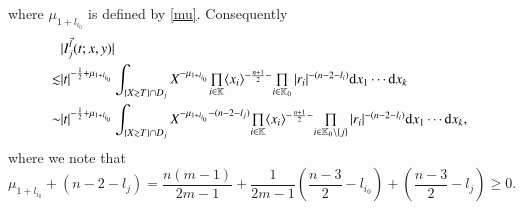 \documentclass[11pt,reqno]{amsart}
\def\d{{\rm d}}
\numberwithin{equation}{section}
\theoremstyle{definition}
\begin{document}
where $\mu_{1+l_{i_0}}$ is defined by \eqref{mu}. Consequently
\begin{equation*}
	\begin{split}
		&|I_j^{\vec{l}}(t;x,y)|\\
		\lesssim&|t|^{-\frac12+\mu_{1+l_{i_0}}}\int_{\{X\gtrsim T\}\cap D_j}X^{-\mu_{1+l_{i_0}}}\mbox{$\prod\limits_{i\in\mathbb{K}}\langle x_i\rangle^{-\frac{n+1}{2}-}$}\mbox{$\prod\limits_{i\in\mathbb{K}_0}|r_i|^{-(n-2-l_i)}$}\d x_1\cdots \d x_k\\
		\sim&|t|^{-\frac12+\mu_{1+l_{i_0}}}\int_{\{X\gtrsim T\}\cap D_j}X^{-\mu_{1+l_{i_0}}-(n-2-l_j)}\mbox{$\prod\limits_{i\in\mathbb{K}}\langle x_i\rangle^{-\frac{n+1}{2}-}$}\mbox{$\prod\limits_{i\in\mathbb{K}_0\setminus\{j\}}|r_i|^{-(n-2-l_i)}$}\d x_1\cdots \d x_k,
	\end{split}
\end{equation*}
where we note that
\begin{equation}\label{Xindexrange}
	\mu_{1+l_{i_0}}+(n-2-l_j)=\mbox{$\frac{n(m-1)}{2m-1}$}+\mbox{$\frac{1}{2m-1}(\frac{n-3}{2}-l_{i_0})$}+(\mbox{$\frac{n-3}{2}-l_j$})\geq0.
\end{equation}
\end{document}
